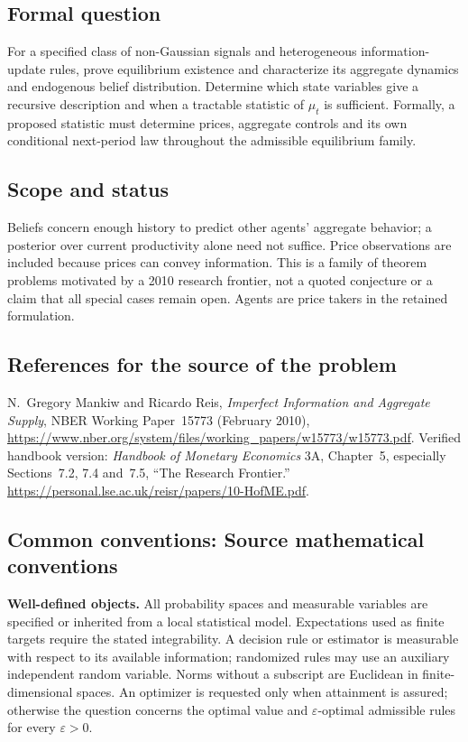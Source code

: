 \documentclass[11pt,a4paper]{article}
\begin{document}
\subsection*{Formal question}
For a specified class of non-Gaussian signals and heterogeneous information-update rules, prove equilibrium existence and characterize its aggregate dynamics and endogenous belief distribution. Determine which state variables give a recursive description and when a tractable statistic of $\mu_t$ is sufficient. Formally, a proposed statistic must determine prices, aggregate controls and its own conditional next-period law throughout the admissible equilibrium family.
\subsection*{Scope and status}
Beliefs concern enough history to predict other agents' aggregate behavior; a posterior over current productivity alone need not suffice. Price observations are included because prices can convey information. This is a family of theorem problems motivated by a 2010 research frontier, not a quoted conjecture or a claim that all special cases remain open. Agents are price takers in the retained formulation.
\subsection*{References for the source of the problem}
N.~Gregory Mankiw and Ricardo Reis, \emph{Imperfect Information and Aggregate Supply}, NBER Working Paper~15773 (February 2010), \url{https://www.nber.org/system/files/working_papers/w15773/w15773.pdf}. Verified handbook version: \emph{Handbook of Monetary Economics} 3A, Chapter~5, especially Sections~7.2, 7.4 and~7.5, ``The Research Frontier.'' \url{https://personal.lse.ac.uk/reisr/papers/10-HofME.pdf}.

\subsection*{Common conventions: Source mathematical conventions}

\textbf{Well-defined objects.}
All probability spaces and measurable variables are specified or inherited
from a local statistical model. Expectations used as finite targets require
the stated integrability. A decision rule or estimator is measurable with
respect to its available information; randomized rules may use an auxiliary
independent random variable. Norms without a subscript are Euclidean in
finite-dimensional spaces. An optimizer is requested only when attainment
is assured; otherwise the question concerns the optimal value and
$\varepsilon$-optimal admissible rules for every $\varepsilon>0$.
\end{document}
